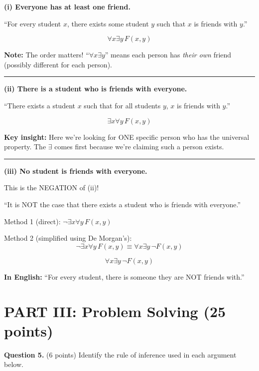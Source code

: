 \documentclass[11pt,a4paper]{article}
\begin{document}
\begin{solnbox}
\textbf{(i) Everyone has at least one friend.}

``For every student $x$, there exists some student $y$ such that $x$ is friends with $y$.''

$$\boxed{\forall x \exists y\, F(x, y)}$$

\textbf{Note:} The order matters! ``$\forall x \exists y$'' means each person has \textit{their own} friend (possibly different for each person).

\rule{\linewidth}{0.3pt}

\textbf{(ii) There is a student who is friends with everyone.}

``There exists a student $x$ such that for all students $y$, $x$ is friends with $y$.''

$$\boxed{\exists x \forall y\, F(x, y)}$$

\textbf{Key insight:} Here we're looking for ONE specific person who has the universal property. The $\exists$ comes first because we're claiming such a person exists.

\rule{\linewidth}{0.3pt}

\textbf{(iii) No student is friends with everyone.}

This is the NEGATION of (ii)!

``It is NOT the case that there exists a student who is friends with everyone.''

Method 1 (direct): $\neg \exists x \forall y\, F(x, y)$

Method 2 (simplified using De Morgan's):
$$\neg \exists x \forall y\, F(x, y) \equiv \forall x \exists y\, \neg F(x, y)$$

$$\boxed{\forall x \exists y\, \neg F(x, y)}$$

\textbf{In English:} ``For every student, there is someone they are NOT friends with.''
\end{solnbox}

\newpage

\section*{PART III: Problem Solving (25 points)}

\textbf{Question 5.} (6 points) Identify the rule of inference used in each argument below.
\end{document}
